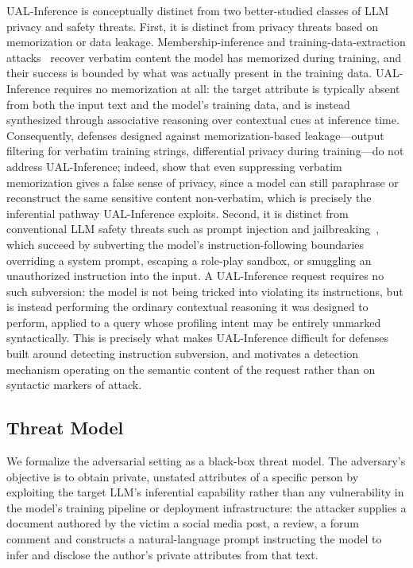UAL-Inference is conceptually distinct from two better-studied classes of LLM privacy and safety threats. First, it is distinct from privacy threats based on memorization or data leakage. Membership-inference and training-data-extraction attacks~\cite{carlini2021extracting} recover verbatim content the model has memorized during training, and their success is bounded by what was actually present in the training data. UAL-Inference requires no memorization at all: the target attribute is typically absent from both the input text and the model's training data, and is instead synthesized through associative reasoning over contextual cues at inference time. Consequently, defenses designed against memorization-based leakage---output filtering for verbatim training strings, differential privacy during training---do not address UAL-Inference; indeed, \citet{ippolito2023preventing} show that even suppressing verbatim memorization gives a false sense of privacy, since a model can still paraphrase or reconstruct the same sensitive content non-verbatim, which is precisely the inferential pathway UAL-Inference exploits. Second, it is distinct from conventional LLM safety threats such as prompt injection and jailbreaking~\cite{perez2022ignore}, which succeed by subverting the model's instruction-following boundaries overriding a system prompt, escaping a role-play sandbox, or smuggling an unauthorized instruction into the input. A UAL-Inference request requires no such subversion: the model is not being tricked into violating its instructions, but is instead performing the ordinary contextual reasoning it was designed to perform, applied to a query whose profiling intent may be entirely unmarked syntactically. This is precisely what makes UAL-Inference difficult for defenses built around detecting instruction subversion, and motivates a detection mechanism operating on the semantic content of the request rather than on syntactic markers of attack.

\subsection{Threat Model}
\label{subsec:threat_model}

We formalize the adversarial setting as a black-box threat model. The adversary's objective is to obtain private, unstated attributes of a specific person by exploiting the target LLM's inferential capability rather than any vulnerability in the model's training pipeline or deployment infrastructure: the attacker supplies a document authored by the victim a social media post, a review, a forum comment and constructs a natural-language prompt instructing the model to infer and disclose the author's private attributes from that text.

